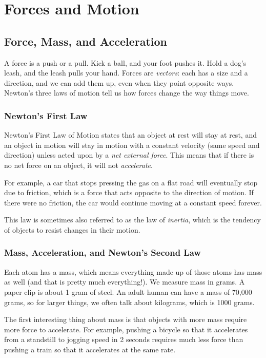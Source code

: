 \chapter{Forces and Motion}


\section{Force, Mass, and Acceleration}
A force is a push or a pull. Kick a ball, and your foot pushes it. Hold a dog's leash, and the leash pulls your hand. Forces are \textit{vectors}: each has a size and a direction, and we can add them up, even when they point opposite ways. Newton's three laws of motion tell us how forces change the way things move.

\subsection{Newton's First Law}
Newton's First Law of Motion states that an object at rest will stay at rest, and an object in motion will stay in motion with a constant velocity (same speed and direction) unless acted upon by a \emph{net external force}. This means that if there is no net force on an object, it will not \emph{accelerate}. 

For example, a car that stops pressing the gas on a flat road will eventually stop due to friction, which is a force that acts opposite to the direction of motion. If there were no friction, the car would continue moving at a constant speed forever.

This law is sometimes also referred to as the law of \emph{inertia}, which is the tendency of objects to resist changes in their motion. 
\subsection{Mass, Acceleration, and Newton's Second Law}

Each atom has a mass, which means everything made up of those atoms has mass as 
well (and that is pretty much everything!). We measure mass in grams. A paper clip is about 1 gram of steel. An adult human can have a mass of 70,000 grams, so for larger things, we often talk about kilograms, which is 1000 grams.

The first interesting thing about mass is that objects with more mass
require more force to accelerate. For example, pushing a bicycle so
that it accelerates from a standstill to jogging speed in 2 seconds
requires much less force than pushing a train so that it accelerates
at the same rate.


